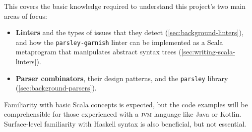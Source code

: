 \documentclass[../../main.tex]{subfiles}
\begin{document}
\label{sec:background}
This  covers the basic knowledge required to understand this project's two main areas of focus:
\begin{itemize}
  \item \textbf{Linters} and the types of issues that they detect (\cref{sec:background-linters}), and how the \texttt{parsley-garnish} linter can be implemented as a Scala metaprogram that manipulates abstract syntax trees (\cref{sec:writing-scala-linters}).
  \item \textbf{Parser combinators}, their design patterns, and the \texttt{parsley} library (\cref{sec:background-parsers}).
\end{itemize}
%
Familiarity with basic Scala concepts is expected, but the code examples will be comprehensible for those experienced with a \textsc{jvm} language like Java or Kotlin.
Surface-level familiarity with Haskell syntax is also beneficial, but not essential.

%
%
\end{document}
